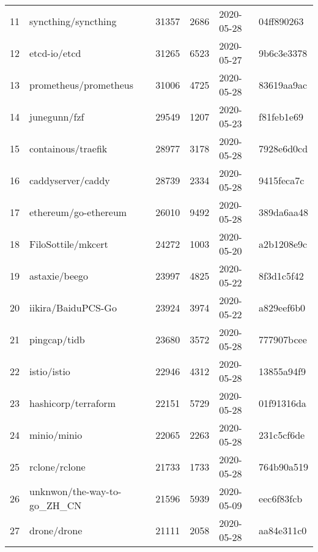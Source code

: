 \begin{footnotesize}
\begin{longtable}{llrrll}
        11  &                                syncthing/syncthing &  31357 &   2686 & 2020-05-28 &  04ff890263 \\
        12  &                                       etcd-io/etcd &  31265 &   6523 & 2020-05-27 &  9b6c3e3378 \\
        13  &                              prometheus/prometheus &  31006 &   4725 & 2020-05-28 &  83619aa9ac \\
        14  &                                       junegunn/fzf &  29549 &   1207 & 2020-05-23 &  f81feb1e69 \\
        15  &                                 containous/traefik &  28977 &   3178 & 2020-05-28 &  7928e6d0cd \\
        16  &                                  caddyserver/caddy &  28739 &   2334 & 2020-05-28 &  9415feca7c \\
        17  &                               ethereum/go-ethereum &  26010 &   9492 & 2020-05-28 &  389da6aa48 \\
        18  &                                 FiloSottile/mkcert &  24272 &   1003 & 2020-05-20 &  a2b1208e9c \\
        19  &                                      astaxie/beego &  23997 &   4825 & 2020-05-22 &  8f3d1c5f42 \\
        20  &                                 iikira/BaiduPCS-Go &  23924 &   3974 & 2020-05-22 &  a829eef6b0 \\
        21  &                                       pingcap/tidb &  23680 &   3572 & 2020-05-28 &  777907bcee \\
        22  &                                        istio/istio &  22946 &   4312 & 2020-05-28 &  13855a94f9 \\
        23  &                                hashicorp/terraform &  22151 &   5729 & 2020-05-28 &  01f91316da \\
        24  &                                        minio/minio &  22065 &   2263 & 2020-05-28 &  231c5cf6de \\
        25  &                                      rclone/rclone &  21733 &   1733 & 2020-05-28 &  764b90a519 \\
        26  &                        unknwon/the-way-to-go\_ZH\_CN &  21596 &   5939 & 2020-05-09 &  eec6f83fcb \\
        27  &                                        drone/drone &  21111 &   2058 & 2020-05-28 &  aa84e311c0 \\

\end{longtable}
\end{footnotesize}
